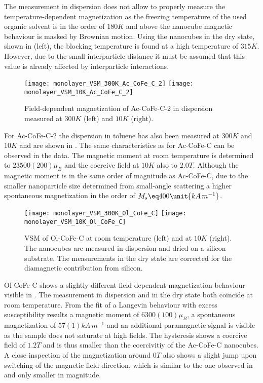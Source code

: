 \documentclass[\main/dresen_thesis.tex]{subfiles}
\begin{document}
  The measurement in dispersion does not allow to properly measure the temperature-dependent magnetization as the freezing temperature of the used organic solvent is in the order of $180 \unit{K}$ and above the nanocube magnetic behaviour is masked by Brownian motion.
  Using the nanocubes in the dry state, shown in  (left), the blocking temperature is found at a high temperature of $315 \unit{K}$.
  However, due to the small interparticle distance it must be assumed that this value is already affected by interparticle interactions.

  \begin{figure}[tb]
    \centering
    \texttt{[image: monolayer\_VSM\_300K\_Ac\_CoFe\_C\_2]}
    \texttt{[image: monolayer\_VSM\_10K\_Ac\_CoFe\_C\_2]}
    \caption{\label{fig:monolayers:nanoparticle:vsmAcCoFeC2}Field-dependent magnetization of Ac-CoFe-C-2 in dispersion measured at $300 \unit{K}$ (left) and $10 \unit{K}$ (right).}
  \end{figure}
  For Ac-CoFe-C-2 the dispersion in toluene has also been measured at $300 \unit{K}$ and $10 \unit{K}$ and are shown in .
  The same characteristics as for Ac-CoFe-C can be observed in the data.
  The magnetic moment at room temperature is determined to $23500(200) \mu_B$ and the coercive field at $10 \unit{K}$ also to $2.0 \unit{T}$.
  Although the magnetic moment is in the same order of magnitude as Ac-CoFe-C, due to the smaller nanoparticle size determined from small-angle scattering a higher spontaneous magnetization in the order of $M_s \eq 400 \unit{kA \, m^{-1}}$.

  \begin{figure}[tb]
    \centering
    \texttt{[image: monolayer\_VSM\_300K\_Ol\_CoFe\_C]}
    \texttt{[image: monolayer\_VSM\_10K\_Ol\_CoFe\_C]}
    \caption{\label{fig:monolayers:nanoparticle:vsmOlCoFeC}VSM of Ol-CoFe-C at room temperature (left) and at $10 \unit{K}$ (right). The nanocubes are measured in dispersion and dried on a silicon substrate. The measurements in the dry state are corrected for the diamagnetic contribution from silicon.}
  \end{figure}

  Ol-CoFe-C shows a slightly different field-dependent magnetization behaviour visible in .
  The measurement in dispersion and in the dry state both coincide at room temperature.
  From the fit of a Langevin behaviour with excess susceptibility results a magnetic moment of $6300(100) \mu_B$, a spontaneous magnetization of $57(1) \unit{kA \, m^{-1}}$ and an additional paramagnetic signal is visible as the sample does not saturate at high fields.
  The hysteresis shows a coercive field of $1.2 \unit{T}$ and is thus smaller than the coercivitiy of the Ac-CoFe-C nanocubes.
  A close inspection of the magnetization around $0 \unit{T}$ also shows a slight jump upon switching of the magnetic field direction, which is similar to the one observed in  and only smaller in magnitude.
\end{document}
